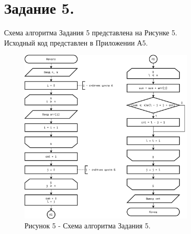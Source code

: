 \documentclass[oneside,a4paper,14pt]{extarticle}
\begin{document}
\section*{Задание 5.}
\noindent Схема алгоритма Задания 5 представлена на Рисунке 5.\\
\noindent Исходный код представлен в Приложении А5. \\

\begin{figure}[!ht]
	\centering
	\includegraphics[width=0.75\textwidth]{pics/flowchart-17.png}
	\caption*{Рисунок 5 - Схема алгоритма Задания 5.}
\end{figure}
\end{document}
